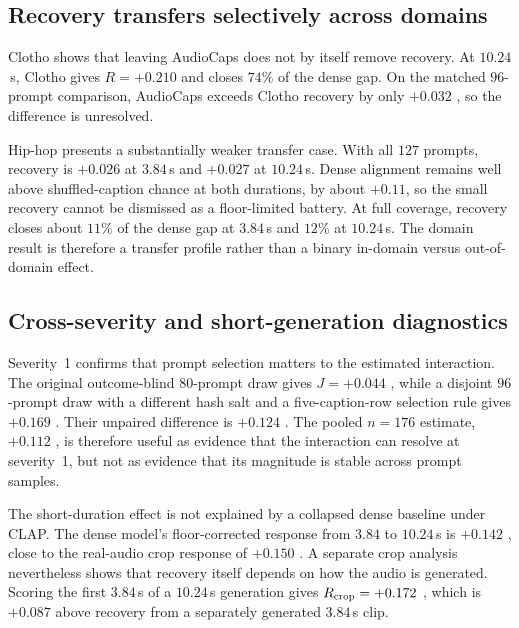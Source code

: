\subsection{Recovery transfers selectively across domains}
Clotho shows that leaving AudioCaps does not by itself remove recovery. At $10.24$\,s, Clotho gives $R=+0.210$  and closes $74\%$ of the dense gap. On the matched $96$-prompt comparison, AudioCaps exceeds Clotho recovery by only $+0.032$ , so the difference is unresolved.

Hip-hop presents a substantially weaker transfer case. With all $127$ prompts, recovery is $+0.026$  at $3.84$\,s and $+0.027$  at $10.24$\,s. Dense alignment remains well above shuffled-caption chance at both durations, by about $+0.11$, so the small recovery cannot be dismissed as a floor-limited battery. At full coverage, recovery closes about $11\%$ of the dense gap at $3.84$\,s and $12\%$ at $10.24$\,s. The domain result is therefore a transfer profile rather than a binary in-domain versus out-of-domain effect.

\subsection{Cross-severity and short-generation diagnostics}
Severity~1 confirms that prompt selection matters to the estimated interaction. The original outcome-blind $80$-prompt draw gives $J=+0.044$ , while a disjoint $96$-prompt draw with a different hash salt and a five-caption-row selection rule gives $+0.169$ . Their unpaired difference is $+0.124$ . The pooled $n=176$ estimate, $+0.112$ , is therefore useful as evidence that the interaction can resolve at severity~1, but not as evidence that its magnitude is stable across prompt samples.

The short-duration effect is not explained by a collapsed dense baseline under CLAP. The dense model's floor-corrected response from $3.84$ to $10.24$\,s is $+0.142$ , close to the real-audio crop response of $+0.150$ . A separate crop analysis nevertheless shows that recovery itself depends on how the audio is generated. Scoring the first $3.84$\,s of a $10.24$\,s generation gives $R_{\rm crop}=+0.172$ , which is $+0.087$  above recovery from a separately generated $3.84$\,s clip.

